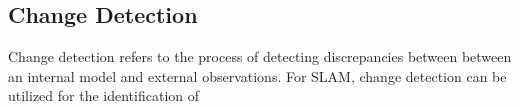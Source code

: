 \subsection{Change Detection}

Change detection refers to the process of detecting discrepancies between between an internal model and external observations. For SLAM, change detection can be utilized for the identification of 